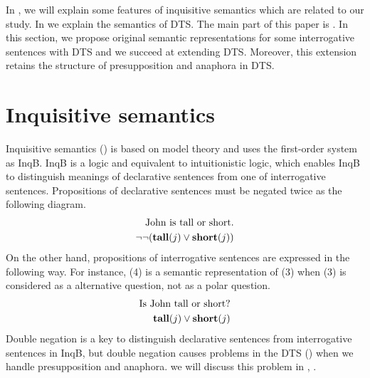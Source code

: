 \documentclass[a4paper,11pt, leqno]{article}
\begin{document}
In , we will explain some features of inquisitive semantics which are related to our study. In  we explain the semantics of DTS. The main part of this paper is . In this section, we propose original semantic representations for some interrogative sentences with DTS and we succeed at extending DTS. Moreover, this extension retains the structure of presupposition and anaphora in DTS.  
\section{Inquisitive semantics\label{section:background}}
Inquisitive semantics (\citet{ciardelli2012inquisitive}) is based on model theory and uses the first-order system as InqB. InqB is a logic and equivalent to intuitionistic logic, which enables InqB to distinguish meanings of declarative sentences from one of interrogative sentences. Propositions of declarative sentences must be negated twice as the following diagram.
\begin{align}
\mbox{John is tall or short.} \\
\lnot\lnot (\normalfont \textbf{tall}(j)\lor\normalfont \textbf{short}(j)) 
\end{align}
On the other hand, propositions of interrogative sentences  are expressed in the following way. For instance, (4) is a semantic representation of (3) when (3) is considered as a alternative question, not as a polar question.
\begin{align}
\mbox{Is John tall or short?} \\
\normalfont \textbf{tall}(j)\lor\normalfont \textbf{short}(j)
\end{align}
Double negation is a key to distinguish declarative sentences from interrogative sentences in InqB, but double negation causes problems in the DTS (\citet{BekkiMineshima2016}) when we handle presupposition and anaphora. we will discuss this problem in , .\par
\end{document}
